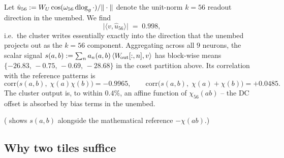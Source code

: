 Let $\hat u_{56} := W_U \cos(\omega_{56} \operatorname{dlog}_g \cdot)/\|\cdot\|$
denote the unit-norm $k = 56$ readout direction in the unembed.  We
find
\begin{equation}
  \bigl|\langle v, \hat u_{56}\rangle\bigr| \;=\; 0.998,
  \label{eq:legendre-Wout-alignment}
\end{equation}
i.e.\ the cluster writes essentially exactly into the direction that
the unembed projects out as the $k = 56$ component.  Aggregating across
all $9$ neurons, the scalar signal $s(a, b) := \sum_n a_n(a, b)
\,\langle W_{\!\text{out}}[:, n], v\rangle$ has block-wise means $\{-26.83,\,
-0.75,\, -0.69,\, -28.68\}$ in the coset partition above.  Its
correlation with the reference patterns is
\begin{equation}
  \mathrm{corr}\bigl(s(a, b),\; \chi(a)\chi(b)\bigr) = -0.9965,
  \qquad
  \mathrm{corr}\bigl(s(a, b),\; \chi(a)+\chi(b)\bigr) = +0.0485.
  \label{eq:legendre-correlation}
\end{equation}
The cluster output is, to within $0.4\%$, an affine function of
$\chi_{56}(ab)$ -- the DC offset is absorbed by bias terms in the
unembed.

( shows $s(a, b)$ alongside the
mathematical reference $-\chi(ab)$.)

\subsection{Why two tiles suffice}
\label{subsec:legendre-algebra}

